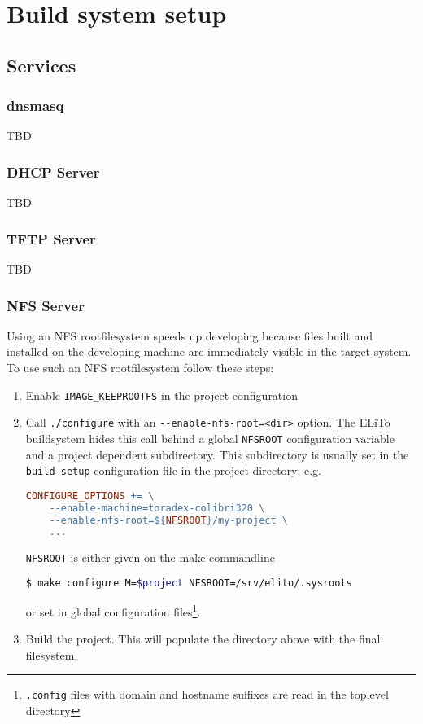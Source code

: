 \chapter{Build system setup}
\label{chap:setup}

\section{Services}
\label{sec:setup_services}

\subsection{dnsmasq}
\label{sec:setup_services_dnsmasq}

TBD

\subsection{DHCP Server}
\label{sec:setup_services_dhcp-server}

TBD

\subsection{TFTP Server}
\label{sec:setup_services_tftp-server}

TBD

\subsection{NFS Server}
\label{sec:setup_services_nfs-server}

Using an NFS rootfilesystem speeds up developing because files built
and installed on the developing machine are immediately visible in the
target system.  To use such an NFS rootfilesystem follow these steps:

\begin{enumerate}
\item Enable \texttt{IMAGE\_KEEPROOTFS} in the project configuration
\item Call \texttt{./configure} with an
  \texttt{-\mbox{}-enable-nfs-root=<dir>} option. The ELiTo buildsystem hides
  this call behind a global \texttt{NFSROOT} configuration variable
  and a project dependent subdirectory.  This subdirectory is usually
  set in the \texttt{build-setup} configuration file in the project
  directory; e.g.
\begin{lstlisting}[language=make]
CONFIGURE_OPTIONS += \
	--enable-machine=toradex-colibri320 \
	--enable-nfs-root=${NFSROOT}/my-project \
	...
\end{lstlisting}%
  \texttt{NFSROOT} is either given on the make commandline
\begin{lstlisting}[language=bash]
$ make configure M=$project NFSROOT=/srv/elito/.sysroots
\end{lstlisting}
or set in global configuration files\footnote{\texttt{.config} files
  with domain and hostname suffixes are read in the toplevel
  directory}.
\item Build the project. This will populate the directory above with
  the final filesystem.
\end{enumerate}

